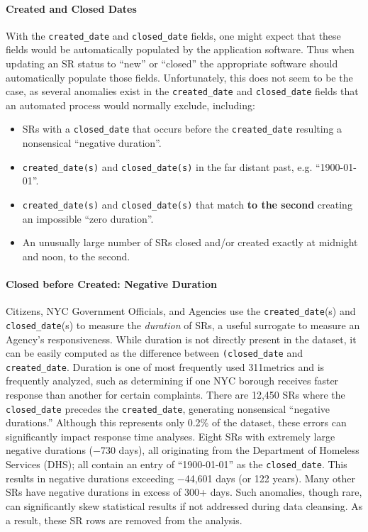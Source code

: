 \documentclass[linenumber]{jdsart}
\begin{document}
\paragraph{Created and Closed Dates}
\label{sec:negativeduration}
With the \texttt{created\_date} and \texttt{closed\_date} fields, one 
might expect that these fields would be automatically populated by the  
application software. Thus when updating an SR status to ``new'' or ``closed''
the appropriate software should automatically populate those fields. 
Unfortunately, this does not seem to be the case, as several anomalies 
exist in the \texttt{created\_date} and \texttt{closed\_date} fields that
an automated process would normally exclude, including:

\begin{itemize}
    \item SRs with a \texttt{closed\_date} that occurs before the 
    \texttt{created\_date} resulting a nonsensical ``negative duration''.
    \item \texttt{created\_date(s)} and \texttt{closed\_date(s)} in 
    the far distant past, e.g. ``1900-01-01''.
    \item \texttt{created\_date(s)} and \texttt{closed\_date(s)} that 
    match \textbf{to the second} creating an impossible ``zero duration''.
    \item An unusually large number of SRs closed and/or created exactly at midnight 
    and noon, to the second.
\end{itemize}

\paragraph{Closed before Created: Negative Duration}
Citizens, NYC Government Officials, and Agencies use the \texttt{created\_date}(s) and 
\texttt{closed\_date}(s) to measure the \textit{duration} of SRs, 
a useful surrogate to measure an Agency's responsiveness. 
While duration is not directly present in the dataset, 
it can be easily computed as the difference between
\texttt{(closed\_date} and \texttt{created\_date}.  Duration is one of 
most frequently used 311metrics and is frequently analyzed, such as determining if 
one NYC borough receives faster response than another for certain 
complaints. There are 12,450 SRs where the \texttt{closed\_date} precedes the 
\texttt{created\_date}, generating nonsensical ``negative durations.'' 
Although this represents only 0.2\% of the dataset, these errors can 
significantly impact response time analyses. Eight SRs with extremely 
large negative durations ($-$730 days), all originating from the 
Department of Homeless Services (DHS); all contain an entry 
of ``1900-01-01'' as the \texttt{closed\_date}. This results 
in negative durations exceeding $-$44,601 days (or 122 years). Many
other SRs have negative durations in excess of 300+ days. Such 
anomalies, though rare, can significantly skew statistical results if 
not addressed during data cleansing. As a result, these SR rows are 
removed from the analysis. 
\end{document}
